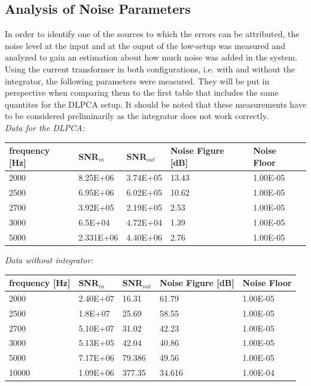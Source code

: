 \subsection{Analysis of Noise Parameters}

In order to identify one of the sources to which the errors can be attributed, the noise level at the input and at the ouput of the low-setup was measured and analyzed to gain an estimation about how much noise was added in the system.
Using the current transformer in both configurations, i.e. with and without the integrator, the following parameters were measured. They will be put in perspective when comparing them to the first table that includes the same quantites for the DLPCA setup. It should be noted that these measurements have to be considered preliminarily as the integrator does not work correctly. \\


\textit{Data for the DLPCA:}


\begin{center}
\begin{tabular}{|m{3cm}|m{3cm}|m{2.5cm}|m{3.2cm}|m{2cm}|} 
\hline
frequency [Hz]& SNR$_{in}$ & SNR$_{out}$ & Noise Figure [dB] & Noise Floor \\ 
\hline \hline
2000 &  8.25E+06 &  3.74E+05 & 13.43 & 1.00E-05 \\ 
\hline
2500 & 6.95E+06 & 6.02E+05 & 10.62 & 1.00E-05 \\ 
\hline
2700 & 3.92E+05 & 2.19E+05 & 2.53 & 1.00E-05 \\ 
\hline
3000 & 6.5E+04 & 4.72E+04 & 1.39 & 1.00E-05 \\ 
\hline
5000 & 2.331E+06 & 4.40E+06 & 2.76 & 1.00E-05 \\ 
\hline
\end{tabular}
\end{center}


\textit{Data without integrator:}
\begin{center}
\begin{tabular}{|m{3cm}|m{3cm}|m{2.5cm}|m{3.2cm}|m{2cm}|} 
\hline
frequency [Hz]& SNR$_{in}$ & SNR$_{out}$ & Noise Figure [dB] & Noise Floor \\ 
\hline \hline
2000 & 2.40E+07 & 16.31 & \cellcolor{blue!25}61.79 & 1.00E-05 \\ 
\hline
2500 & 1.8E+07 & 25.69 & \cellcolor{blue!25}58.55 & 1.00E-05 \\ 
\hline
2700 & 5.10E+07 & 31.02 & \cellcolor{blue!25}42.23 & 1.00E-05 \\ 
\hline
3000 & 5.13E+05 & 42.04 & \cellcolor{blue!25}40.86 & 1.00E-05 \\ 
\hline
5000 & 7.17E+06 & 79.386 & \cellcolor{blue!25}49.56 & 1.00E-05 \\ 
\hline
10000 & 1.09E+06 & 377.35 & \cellcolor{red!25}34.616 & 1.00E-04 \\ 
\hline

\end{tabular}
\end{center}

